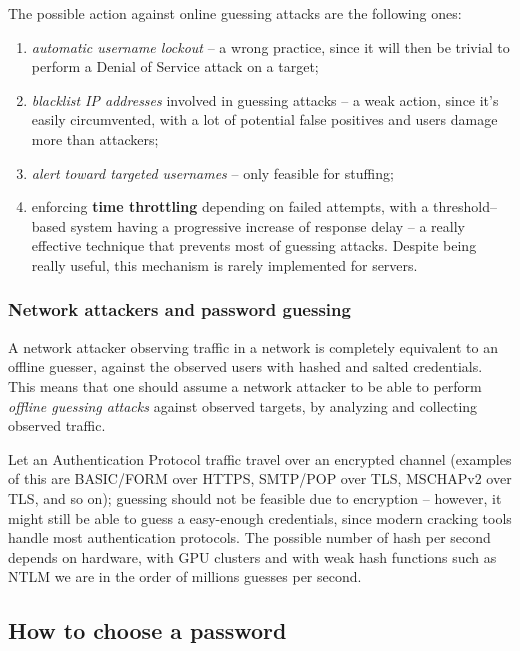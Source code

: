 \documentclass[10pt]{extbook}
\begin{document}
The possible action against online guessing attacks are the following ones:
\begin{enumerate}
    \item \emph{automatic username lockout} -- a wrong practice, since it will
        then be trivial to perform a Denial of Service attack on a target;
    \item \emph{blacklist IP addresses} involved in guessing attacks -- a weak
        action, since it's easily circumvented, with a lot of potential false
        positives and users damage more than attackers;
    \item \emph{alert toward targeted usernames} -- only feasible for stuffing;
    \item enforcing \textbf{time throttling} depending on failed attempts, with
        a threshold\---based system having a progressive increase of response
        delay -- a really effective technique that prevents most of guessing
        attacks. Despite being really useful, this mechanism is rarely
        implemented for servers.
\end{enumerate}

\subsubsection{Network attackers and password guessing}

A network attacker observing traffic in a network is completely equivalent to
an offline guesser, against the observed users with hashed and salted
credentials. This means that one should assume a network attacker to be able to
perform \emph{offline guessing attacks} against observed targets, by analyzing
and collecting observed traffic.

Let an Authentication Protocol traffic travel over an encrypted channel
(examples of this are BASIC/FORM over HTTPS, SMTP/POP over TLS, MSCHAPv2 over
TLS, and so on); guessing should not be feasible due to encryption -- however,
it might still be able to guess a easy\--enough credentials, since modern
cracking tools handle most authentication protocols. The possible number of
hash per second depends on hardware, with GPU clusters and with weak hash
functions such as NTLM we are in the order of millions guesses per second.

\subsection{How to choose a password}
\end{document}
